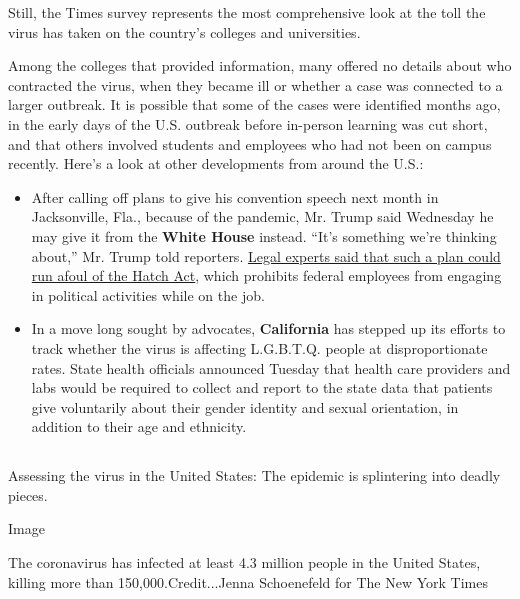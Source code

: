 Still, the Times survey represents the most comprehensive look at the
toll the virus has taken on the country's colleges and universities.

Among the colleges that provided information, many offered no details
about who contracted the virus, when they became ill or whether a case
was connected to a larger outbreak. It is possible that some of the
cases were identified months ago, in the early days of the U.S. outbreak
before in-person learning was cut short, and that others involved
students and employees who had not been on campus recently. Here's a
look at other developments from around the U.S.:

\begin{itemize}
\tightlist
\item
  After calling off plans to give his convention speech next month in
  Jacksonville, Fla., because of the pandemic, Mr. Trump said Wednesday
  he may give it from the \textbf{White House} instead. ``It's something
  we're thinking about,'' Mr. Trump told reporters.
  \href{https://www.nytimes.com/2020/07/29/us/elections/biden-vs-trump.html?action=click\&module=Top\%20Stories\&pgtype=Homepage\#link-7eba6945}{Legal
  experts said that such a plan could run afoul of the Hatch Act}, which
  prohibits federal employees from engaging in political activities
  while on the job.
\end{itemize}

\begin{itemize}
\tightlist
\item
  In a move long sought by advocates, \textbf{California} has stepped up
  its efforts to track whether the virus is affecting L.G.B.T.Q. people
  at disproportionate rates. State health officials announced Tuesday
  that health care providers and labs would be required to collect and
  report to the state data that patients give voluntarily about their
  gender identity and sexual orientation, in addition to their age and
  ethnicity.
\end{itemize}

\hypertarget{-7}{%
\subsection{}\label{-7}}

Assessing the virus in the United States: The epidemic is splintering
into deadly pieces.

Image

The coronavirus has infected at least 4.3 million people in the United
States, killing more than 150,000.Credit...Jenna Schoenefeld for The New
York Times


